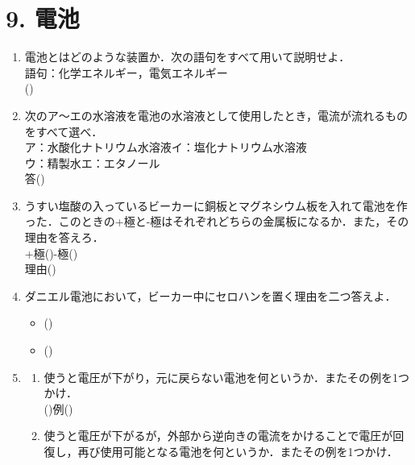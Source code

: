 \section*{9. 電池}
\begin{enumerate}
    \item 電池とはどのような装置か．次の語句をすべて用いて説明せよ．\\
    語句：化学エネルギー，電気エネルギー\\
    (\hspace{15cm})
    \item 次のア～エの水溶液を電池の水溶液として使用したとき，電流が流れるものをすべて選べ．\\
    ア：水酸化ナトリウム水溶液\hspace{1cm}イ：塩化ナトリウム水溶液\hspace{1cm}\\
    ウ：精製水\hspace{1cm}エ：エタノール\\[0.2cm]
    答(\hspace{3cm})
    \item うすい塩酸の入っているビーカーに銅板とマグネシウム板を入れて電池を作った．このときの+極と-極はそれぞれどちらの金属板になるか．また，その理由を答えろ．\\
    +極(\hspace{2cm})\hspace{1cm}-極(\hspace{2cm})\\
    理由(\hspace{15cm})
    \item ダニエル電池において，ビーカー中にセロハンを置く理由を二つ答えよ．
    \begin{itemize}
        \item[1] (\hspace{15cm})\vspace{0.5em}
        \item[2] (\hspace{15cm})
    \end{itemize}
    \item \begin{enumerate}
        \item 使うと電圧が下がり，元に戻らない電池を何というか．またその例を1つかけ．\\
        (\hspace{3cm})\hspace{1cm}例(\hspace{2cm})
        \item 使うと電圧が下がるが，外部から逆向きの電流をかけることで電圧が回復し，再び使用可能となる電池を何というか．またその例を1つかけ．\\

\end{enumerate}
\end{enumerate}
